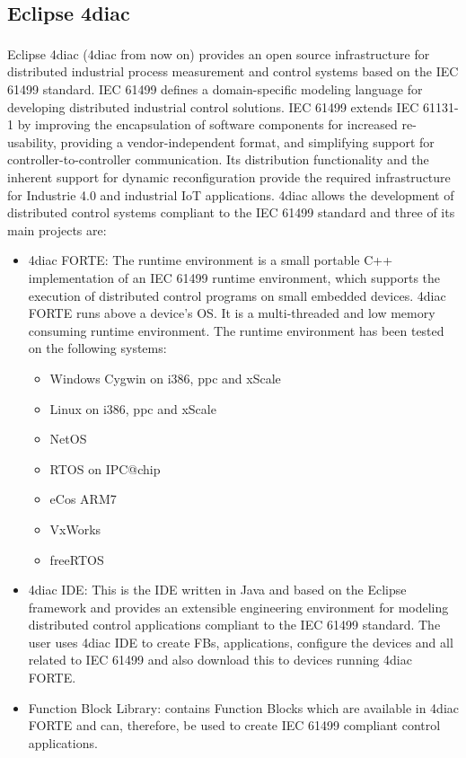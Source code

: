\subsection{Eclipse 4diac\textsuperscript{\texttrademark}}\label{app:4diac}
%
Eclipse 4diac\textsuperscript{\texttrademark} (4diac from now on) provides an open source infrastructure for distributed industrial process measurement and control systems based on the IEC 61499 standard. IEC 61499 defines a domain-specific
modeling language for developing distributed industrial control solutions. IEC 61499 extends IEC 61131-1 by improving the encapsulation of software components for increased re-usability, 
providing a vendor-independent format, and simplifying support for controller-to-controller communication. Its distribution functionality and the inherent support for dynamic reconfiguration 
provide the required infrastructure for Industrie 4.0 and industrial IoT applications.
%
4diac allows the development of distributed control systems compliant to the IEC 61499 standard and three of its main projects are:
%
\begin{itemize}
  \item 4diac FORTE: The runtime environment is a small portable C++ implementation of an IEC 61499 runtime environment, which supports the execution of distributed control programs 
  on small embedded devices. 4diac FORTE runs above a device's OS. It is a multi-threaded and low memory consuming runtime environment. The runtime environment has been tested on the following systems:
  \begin{itemize}
    \item Windows Cygwin on i386, ppc and xScale
    \item Linux on i386, ppc and xScale
    \item NetOS
    \item RTOS on IPC@chip
    \item eCos ARM7
    \item VxWorks
    \item freeRTOS
  \end{itemize}     
  \item 4diac IDE: This is the IDE written in Java and based on the Eclipse framework and provides an extensible engineering environment for modeling 
  distributed control applications compliant to the IEC 61499 standard. The user uses 4diac IDE to create FBs, applications, configure the devices and all related to IEC 61499 and also download this 
  to devices running 4diac FORTE.
  \item Function Block Library: contains Function Blocks which are available in 4diac FORTE and can, therefore, be used to create IEC 61499 compliant control applications.
\end{itemize}
